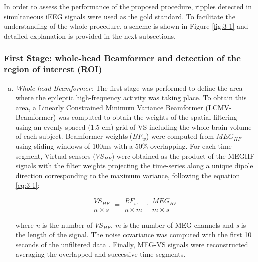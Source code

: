 In order to assess the performance of the proposed procedure, ripples detected in simultaneous iEEG signals were used as the gold standard. To facilitate the understanding of the whole procedure, a scheme is shown in Figure \ref{fig:3-1} and detailed explanation is provided in the next subsections.

\subsubsection*{First Stage: whole-head Beamformer and detection of the region of interest (ROI)} \label{sec:firstStage}

\begin{enumerate}[(a)]
\item \textit{Whole-head Beamformer:} The first stage was performed to define the area where the epileptic high-frequency activity was taking place. To obtain this area, a Linearly Constrained Minimum Variance Beamformer (LCMV-Beamformer) \citep{vanVeen1997} was computed to obtain the weights of the spatial filtering using an evenly spaced (1.5 cm) grid of VS including the whole brain volume of each subject. Beamformer weights ($BF_w$) were computed from $MEG_{HF}$ using sliding windows of 100ms with a 50\% overlapping. For each time segment, Virtual sensors ($VS_{HF}$) were obtained as the product of the MEGHF signals with the filter weights projecting the time-series along a unique dipole direction corresponding to the maximum variance, following the equation \ref{eq:3-1}:

\begin{equation} \label{eq:3-1}
\begin{array}{c} VS_{HF} \\ n \times s \end{array} = \begin{array}{c} BF_{w} \\ n \times m \end{array} \cdot \begin{array}{c} MEG_{HF} \\ m \times s \end{array}
\end{equation}

where \textit{n} is the number of $VS_{HF}$, \textit{m} is the number of MEG channels and \textit{s} is the length of the signal. The noise covariance was computed with the first 10 seconds of the unfiltered data \citep{vanKlink2015}. Finally, MEG-VS signals were reconstructed averaging the overlapped and successive time segments.


\end{enumerate}
